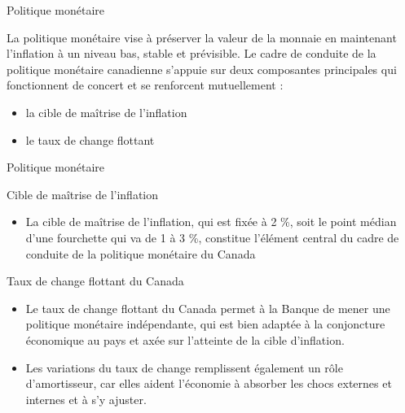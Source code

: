 \documentclass{beamer}
\begin{document}
\begin{frame}{Politique monétaire}

La politique monétaire vise à préserver la valeur de la monnaie en maintenant l’inflation à un niveau bas, stable et prévisible.  Le cadre de conduite de la politique monétaire canadienne s’appuie sur deux composantes principales qui fonctionnent de concert et se renforcent mutuellement : 
\begin{itemize}
\item la cible de maîtrise de l’inflation
\item le taux de change flottant
\end{itemize}
\end{frame}


\begin{frame}{Politique monétaire}

\begin{block}{Cible de maîtrise de l’inflation}
\begin{itemize}
\item La cible de maîtrise de l’inflation, qui est fixée à 2 \%, soit le point médian d’une fourchette qui va de 1 à 3 \%, constitue l’élément central du cadre de conduite de la politique monétaire du Canada
\end{itemize}
\end{block}

\begin{block}{Taux de change flottant du Canada}
\begin{itemize}
\item Le taux de change flottant du Canada permet à la Banque de mener une politique monétaire indépendante, qui est bien adaptée à la conjoncture économique au pays et axée sur l’atteinte de la cible d’inflation. 
\item Les variations du taux de change remplissent également un rôle d’amortisseur,  car elles aident l’économie à absorber les chocs externes et internes et à s’y ajuster.
\end{itemize}
\end{block}
\end{frame}
\end{document}
